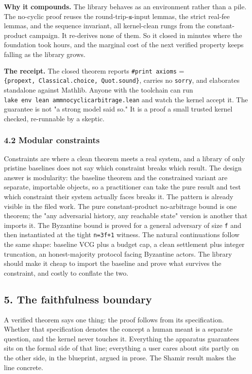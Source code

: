 \documentclass[
  11pt,
]{article}
\renewcommand{\_}{\origunderscore\allowbreak}
\begin{document}
\textbf{Why it compounds.} The library behaves as an environment rather
than a pile. The no-cyclic proof reuses the round-trip-\texttt{≤}-input
lemmas, the strict real-fee lemmas, and the sequence invariant, all
kernel-clean rungs from the constant-product campaign. It re-derives
none of them. So it closed in minutes where the foundation took hours,
and the marginal cost of the next verified property keeps falling as the
library grows.

\textbf{The receipt.} The closed theorem reports
\texttt{\#print\ axioms} =
\texttt{\{propext,\ Classical.choice,\ Quot.sound\}}, carries no
\texttt{sorry}, and elaborates standalone against Mathlib. Anyone with
the toolchain can run
\texttt{lake\ env\ lean\ amm\_no\_cyclic\_arbitrage.lean} and watch the
kernel accept it. The guarantee is not "a strong model said so." It is a
proof a small trusted kernel checked, re-runnable by a skeptic.

\subsubsection{4.2 Modular constraints}\label{42-modular-constraints}

Constraints are where a clean theorem meets a real system, and a library
of only pristine baselines does not say which constraint breaks which
result. The design answer is modularity: the baseline theorem and the
constrained variant are separate, importable objects, so a practitioner
can take the pure result and test which constraint their system actually
faces breaks it. The pattern is already visible in the filed work. The
pure constant-product no-arbitrage bound is one theorem; the "any
adversarial history, any reachable state" version is another that
imports it. The Byzantine bound is proved for a general adversary of
size \texttt{f} and then instantiated at the tight \texttt{n=3f+1}
witness. The natural continuations follow the same shape: baseline VCG
plus a budget cap, a clean settlement plus integer truncation, an
honest-majority protocol facing Byzantine actors. The library should
make it cheap to import the baseline and prove what survives the
constraint, and costly to conflate the two.

\subsection{5. The faithfulness
boundary}\label{5-the-faithfulness-boundary}

A verified theorem says one thing: the proof follows from its
specification. Whether that specification denotes the concept a human
meant is a separate question, and the kernel never touches it.
Everything the apparatus guarantees sits on the formal side of that
line; everything a user cares about sits partly on the other side, in
the blueprint, argued in prose. The Shamir result makes the line
concrete.
\end{document}
